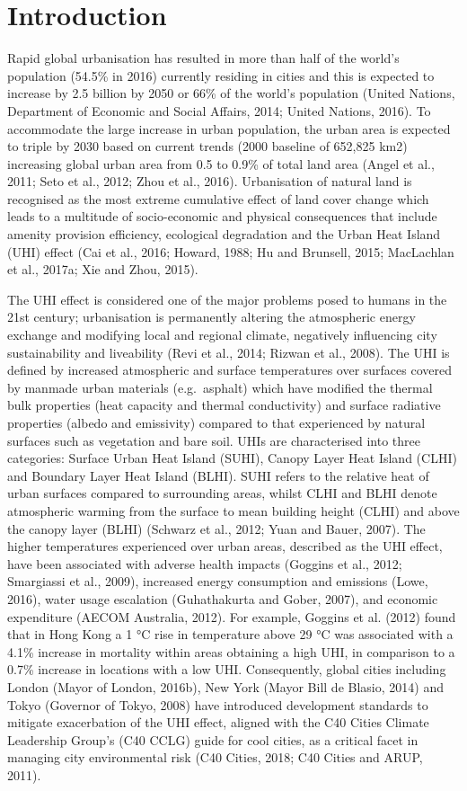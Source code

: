 \documentclass[]{book}
\begin{document}
\section{Introduction}\label{introduction-5}

Rapid global urbanisation has resulted in more than half of the world's
population (54.5\% in 2016) currently residing in cities and this is
expected to increase by 2.5 billion by 2050 or 66\% of the world's
population (United Nations, Department of Economic and Social Affairs,
2014; United Nations, 2016). To accommodate the large increase in urban
population, the urban area is expected to triple by 2030 based on
current trends (2000 baseline of 652,825 km2) increasing global urban
area from 0.5 to 0.9\% of total land area (Angel et al., 2011; Seto et
al., 2012; Zhou et al., 2016). Urbanisation of natural land is
recognised as the most extreme cumulative effect of land cover change
which leads to a multitude of socio-economic and physical consequences
that include amenity provision efficiency, ecological degradation and
the Urban Heat Island (UHI) effect (Cai et al., 2016; Howard, 1988; Hu
and Brunsell, 2015; MacLachlan et al., 2017a; Xie and Zhou, 2015).

The UHI effect is considered one of the major problems posed to humans
in the 21st century; urbanisation is permanently altering the
atmospheric energy exchange and modifying local and regional climate,
negatively influencing city sustainability and liveability (Revi et al.,
2014; Rizwan et al., 2008). The UHI is defined by increased atmospheric
and surface temperatures over surfaces covered by manmade urban
materials (e.g.~asphalt) which have modified the thermal bulk properties
(heat capacity and thermal conductivity) and surface radiative
properties (albedo and emissivity) compared to that experienced by
natural surfaces such as vegetation and bare soil. UHIs are
characterised into three categories: Surface Urban Heat Island (SUHI),
Canopy Layer Heat Island (CLHI) and Boundary Layer Heat Island (BLHI).
SUHI refers to the relative heat of urban surfaces compared to
surrounding areas, whilst CLHI and BLHI denote atmospheric warming from
the surface to mean building height (CLHI) and above the canopy layer
(BLHI) (Schwarz et al., 2012; Yuan and Bauer, 2007). The higher
temperatures experienced over urban areas, described as the UHI effect,
have been associated with adverse health impacts (Goggins et al., 2012;
Smargiassi et al., 2009), increased energy consumption and emissions
(Lowe, 2016), water usage escalation (Guhathakurta and Gober, 2007), and
economic expenditure (AECOM Australia, 2012). For example, Goggins et
al. (2012) found that in Hong Kong a 1 °C rise in temperature above 29
°C was associated with a 4.1\% increase in mortality within areas
obtaining a high UHI, in comparison to a 0.7\% increase in locations
with a low UHI. Consequently, global cities including London (Mayor of
London, 2016b), New York (Mayor Bill de Blasio, 2014) and Tokyo
(Governor of Tokyo, 2008) have introduced development standards to
mitigate exacerbation of the UHI effect, aligned with the C40 Cities
Climate Leadership Group's (C40 CCLG) guide for cool cities, as a
critical facet in managing city environmental risk (C40 Cities, 2018;
C40 Cities and ARUP, 2011).
\end{document}
